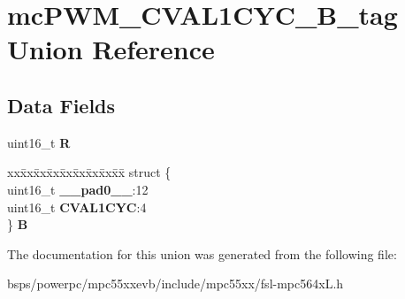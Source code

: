 \hypertarget{unionmcPWM__CVAL1CYC__16B__tag}{}\section{mc\+P\+W\+M\+\_\+\+C\+V\+A\+L1\+C\+Y\+C\+\_\+B\+\_\+tag Union Reference}
\label{unionmcPWM__CVAL1CYC__16B__tag}
\subsection*{Data Fields}
\begin{DoxyCompactItemize}
\item 
\mbox{\label{unionmcPWM__CVAL1CYC__16B__tag_a1d8f37556b103070c0a3b6febb2c6e2d}} 
uint16\+\_\+t {\bfseries R}
\item 
\mbox{\label{unionmcPWM__CVAL1CYC__16B__tag_a8dd4f12a530ba8e77e578d9b4f86c2c3}} 
\begin{tabbing}
xx\=xx\=xx\=xx\=xx\=xx\=xx\=xx\=xx\=\kill
struct \{\\
\>uint16\_t {\bfseries \_\_pad0\_\_}:12\\
\>uint16\_t {\bfseries CVAL1CYC}:4\\
\} {\bfseries B}\\

\end{tabbing}\end{DoxyCompactItemize}


The documentation for this union was generated from the following file\+:\begin{DoxyCompactItemize}
\item 
bsps/powerpc/mpc55xxevb/include/mpc55xx/fsl-\/mpc564x\+L.\+h\end{DoxyCompactItemize}
